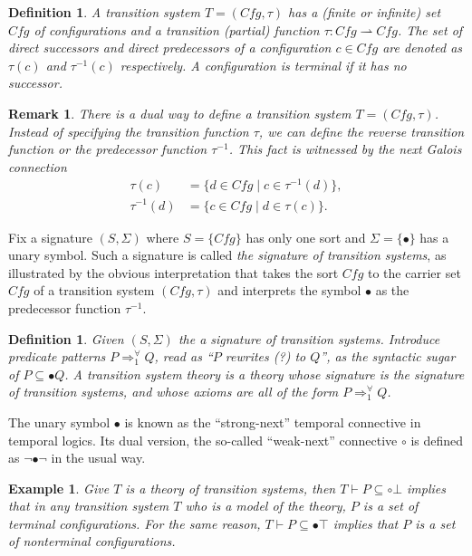 \documentclass{article}
\theoremstyle{plain}
\newtheorem{defn}[thm]{Definition}
\newtheorem{eg}[thm]{Example}
\newtheorem{rmk}[thm]{Remark}
\def\snext{\bullet}
\def\wnext{\circ}
\def\Cfg{\textit{Cfg}}
\begin{document}
\begin{defn}
	A transition system $T = (\Cfg, \tau)$ has a (finite or infinite) set $\Cfg$ of configurations and a transition (partial) function $\tau : \Cfg \rightharpoonup \Cfg$. The set of \emph{direct successors} and \emph{direct predecessors} of a configuration $c \in \Cfg$ are denoted as $\tau(c)$ and $\tau^{-1}(c)$ respectively. A configuration is \emph{terminal} if it has no successor.
\end{defn}

\begin{rmk}
	There is a dual way to define a transition system $T = (\Cfg, \tau)$. Instead of specifying the transition function $\tau$, we can define the \emph{reverse transition function} or the \emph{predecessor function} $\tau^{-1}$. This fact is witnessed by the next Galois connection
	\begin{align*}
	\tau(c)      &= \{d \in \Cfg \mid c \in \tau^{-1}(d) \}, \\
	\tau^{-1}(d) &= \{c \in \Cfg \mid d \in \tau(c) \}.
	\end{align*}
\end{rmk}

Fix a signature $(S,\Sigma)$ where $S = \{\Cfg\}$ has only one sort and $\Sigma = \{\snext\}$ has a unary symbol. Such a signature is called \emph{the signature of transition systems}, as illustrated by the obvious interpretation that takes the sort $\Cfg$ to the carrier set $\Cfg$ of a transition system $(\Cfg, \tau)$ and interprets the symbol $\snext$ as the predecessor function $\tau^{-1}$.

\begin{defn}
  Given $(S, \Sigma)$ the a signature of transition systems. Introduce predicate patterns $P \Rightarrow^\forall_1 Q$, read as ``$P$ rewrites (?) to $Q$'', as the syntactic sugar of $P \subseteq \snext Q$. A transition system theory is a theory whose signature is the signature of transition systems, and whose axioms are all of the form $P \Rightarrow^\forall_1 Q$.
\end{defn}

The unary symbol $\snext$ is known as the ``strong-next'' temporal connective in temporal logics. Its dual version, the so-called ``weak-next'' connective $\circ$ is defined as $\neg \snext \neg$ in the usual way.

\begin{eg}
	Give $T$ is a theory of transition systems, then $T \vdash P \subseteq \wnext \bot$ implies that in any transition system $T$ who is a model of the theory, $P$ is a set of terminal configurations. For the same reason, $T \vdash P \subseteq \snext \top$ implies that $P$ is a set of nonterminal configurations.
\end{eg}
\end{document}
